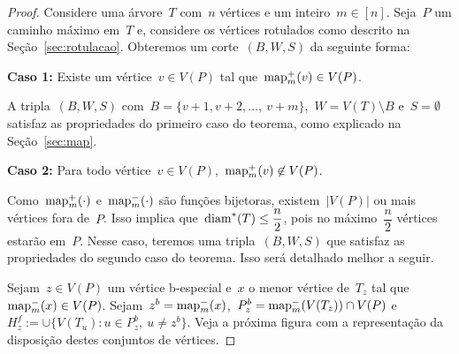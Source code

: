 		\begin{proof}
		Considere uma árvore~$T$ com~${n}$ vértices e um 
		inteiro~${m\in[n]}$.
		Seja~$P$ um caminho máximo em~$T$ e, considere os vértices
		rotulados como descrito na Seção~\ref{sec:rotulacao}.
		Obteremos um corte~$(B,W,S)$ da seguinte forma:
		\bigskip
		\bigskip

		\textbf{Caso 1:}
			Existe um vértice~${v\in V(P)}$ tal 
			que~${\mathrm{map}_m^+(v)\in V(P)}$. 
			
			A tripla~$(B,W,S)$ 
			com~${B =\{v+1, v+2,\ldots,~v+m\}}$,~${W=V(T)\setminus B}$ 
			e~${S=\emptyset}$ satisfaz as propriedades do
			primeiro caso do teorema,
			como explicado na Seção~\ref{sec:map}.

	\bigskip
	\bigskip

		\textbf{Caso 2:}
			Para todo vértice~${v\in V(P)}$,~${\mathrm{map}_m^+(v)\not\in V(P)}$.

			Como~$\mathrm{map}_m^+(\cdot)$ e~$\mathrm{map}_m^-(\cdot)$ são funções bijetoras, 
			existem~$|V(P)|$ ou mais vértices fora de~$P$.
			Isso implica que~${\mathrm{diam}^*(T)\le\dfrac{n}{2}}$, pois no 
			máximo~$\dfrac{n}{2}$ vértices estarão em~$P$.
			Nesse caso, teremos uma tripla~$(B,W,S)$ que satisfaz as
			propriedades do segundo caso do teorema.
			Isso será detalhado melhor a seguir.

			\bigskip
			

			Sejam~${z\in V(P)}$ um vértice b-especial 
			e~$x$ o menor vértice de~$T_z$ tal 
			que~${\mathrm{map}^-_m(x)\in V(P)}$. 
			Sejam~${z^b = \mathrm{map}^-_m(x)}$,~${P_z^b = \mathrm{map}^-_m(V(T_z))\cap V(P)}$
			e~${H_z^f:= \cup\{V(T_u): u\in P^b_z,\ u\ne z^b \}}$.
			Veja a próxima figura com a representação da disposição destes 
			conjuntos de vértices.


\end{proof}
